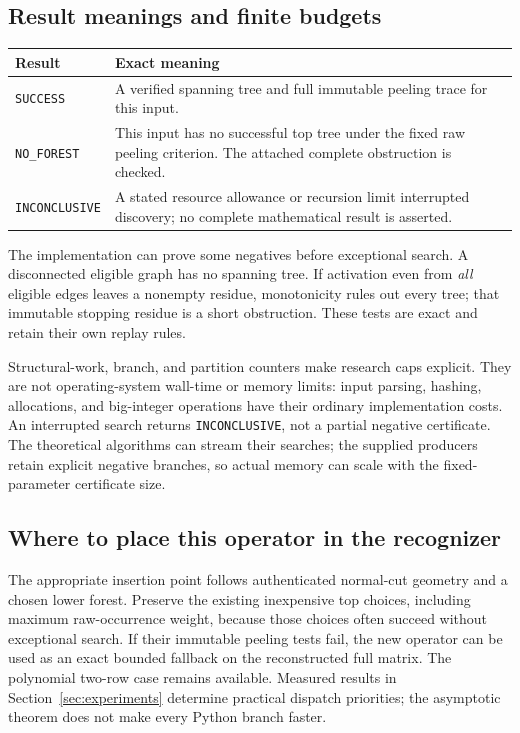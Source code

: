 \subsection{Result meanings and finite budgets}

\begin{center}
\begin{tabularx}{\linewidth}{@{}lX@{}}
\toprule
Result & Exact meaning \\
\midrule
\texttt{SUCCESS} & A verified spanning tree and full immutable peeling
trace for this input. \\
\texttt{NO\_FOREST} & This input has no successful top tree under the
fixed raw peeling criterion. The attached complete obstruction is checked. \\
\texttt{INCONCLUSIVE} & A stated resource allowance or recursion limit
interrupted discovery; no complete mathematical result is asserted. \\
\bottomrule
\end{tabularx}
\end{center}

The implementation can prove some negatives before exceptional search.
A disconnected eligible graph has no spanning tree. If activation even
from \emph{all} eligible edges leaves a nonempty residue, monotonicity
rules out every tree; that immutable stopping residue is a short obstruction.
These tests are exact and retain their own replay rules.

Structural-work, branch, and partition counters make research caps
explicit. They are not operating-system wall-time or memory limits:
input parsing, hashing, allocations, and big-integer operations have their
ordinary implementation costs. An interrupted search returns
\texttt{INCONCLUSIVE}, not a partial negative certificate. The theoretical
algorithms can stream their searches; the supplied producers retain explicit
negative branches, so actual memory can scale with the fixed-parameter
certificate size.

\subsection{Where to place this operator in the recognizer}

The appropriate insertion point follows authenticated normal-cut geometry
and a chosen lower forest. Preserve the existing inexpensive top choices,
including maximum raw-occurrence weight, because those choices often succeed
without exceptional search. If their immutable peeling tests fail, the
new operator can be used as an exact bounded fallback on the reconstructed
full matrix. The polynomial two-row case remains available. Measured
results in Section~\ref{sec:experiments} determine practical dispatch
priorities; the asymptotic theorem does not make every Python branch faster.

